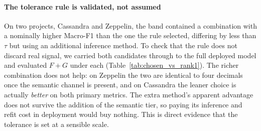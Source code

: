 \documentclass[final,5p,times,twocolumn]{elsarticle}
\theoremstyle{plain}
\begin{document}
\paragraph{The tolerance rule is validated, not assumed} On two projects, Cassandra and
Zeppelin, the band contained a combination with a nominally higher Macro-F1 than the
one the rule selected, differing by less than $\tau$ but using an additional inference
method. To check that the rule does not discard real signal, we carried both candidates
through to the full deployed model and evaluated $F{+}G$ under each
(Table~\ref{tab:chosen_vs_rank1}). The richer combination does not help: on Zeppelin
the two are identical to four decimals once the semantic channel is present, and on
Cassandra the leaner choice is actually \emph{better} on both primary metrics. The
extra method's apparent advantage does not survive the addition of the semantic tier,
so paying its inference and refit cost in deployment would buy nothing. This is direct
evidence that the tolerance is set at a sensible scale.

\begin{table}[t]\centering\small\setlength{\tabcolsep}{6pt}
\caption{Deployed model $F{+}G$ under the parsimony-selected fusion $F$ vs.\ the single best-Macro-F1 (rank-1) fusion, for the two projects where they differ. The chosen $F$ uses \emph{fewer} methods; $\Delta$ is rank-1 $-$ chosen (a positive $\Delta$ means the larger rank-1 model is better). Differences are negligible, confirming the leaner choice loses no deployed accuracy.}
\label{tab:chosen_vs_rank1}
\end{table}
\end{document}
